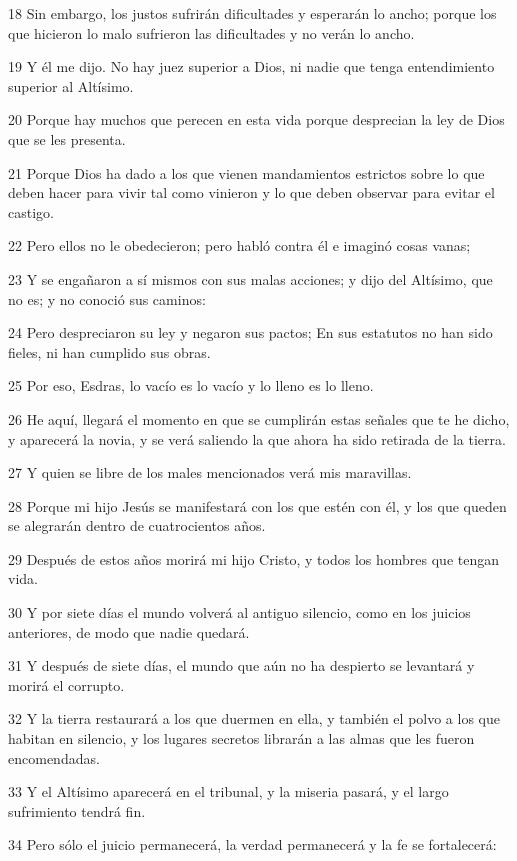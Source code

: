 \par 18 Sin embargo, los justos sufrirán dificultades y esperarán lo ancho; porque los que hicieron lo malo sufrieron las dificultades y no verán lo ancho.
\par 19 Y él me dijo. No hay juez superior a Dios, ni nadie que tenga entendimiento superior al Altísimo.
\par 20 Porque hay muchos que perecen en esta vida porque desprecian la ley de Dios que se les presenta.
\par 21 Porque Dios ha dado a los que vienen mandamientos estrictos sobre lo que deben hacer para vivir tal como vinieron y lo que deben observar para evitar el castigo.
\par 22 Pero ellos no le obedecieron; pero habló contra él e imaginó cosas vanas;
\par 23 Y se engañaron a sí mismos con sus malas acciones; y dijo del Altísimo, que no es; y no conoció sus caminos:
\par 24 Pero despreciaron su ley y negaron sus pactos; En sus estatutos no han sido fieles, ni han cumplido sus obras.
\par 25 Por eso, Esdras, lo vacío es lo vacío y lo lleno es lo lleno.
\par 26 He aquí, llegará el momento en que se cumplirán estas señales que te he dicho, y aparecerá la novia, y se verá saliendo la que ahora ha sido retirada de la tierra.
\par 27 Y quien se libre de los males mencionados verá mis maravillas.
\par 28 Porque mi hijo Jesús se manifestará con los que estén con él, y los que queden se alegrarán dentro de cuatrocientos años.
\par 29 Después de estos años morirá mi hijo Cristo, y todos los hombres que tengan vida.
\par 30 Y por siete días el mundo volverá al antiguo silencio, como en los juicios anteriores, de modo que nadie quedará.
\par 31 Y después de siete días, el mundo que aún no ha despierto se levantará y morirá el corrupto.
\par 32 Y la tierra restaurará a los que duermen en ella, y también el polvo a los que habitan en silencio, y los lugares secretos librarán a las almas que les fueron encomendadas.
\par 33 Y el Altísimo aparecerá en el tribunal, y la miseria pasará, y el largo sufrimiento tendrá fin.
\par 34 Pero sólo el juicio permanecerá, la verdad permanecerá y la fe se fortalecerá:
